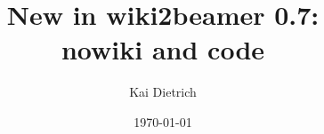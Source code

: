 \documentclass{beamer}
\title{New in wiki2beamer 0.7: \\ nowiki and code}
\author{Kai Dietrich}
\date{\today}
\begin{document}
\frame{\titlepage}


\end{document}
